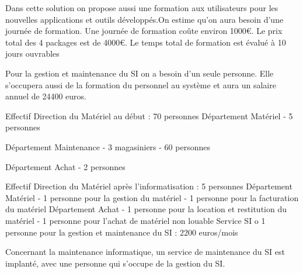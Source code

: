 Dans cette solution on propose aussi une formation aux utilisateurs pour les nouvelles applications et outils
développés.On estime qu’on aura besoin d’une journée de formation. Une journée de formation coûte environ 1000€.
Le prix total des 4 packages est de 4000€.
Le temps total de formation est évalué à 10 jours ouvrables

Pour la gestion et maintenance du SI on a besoin d'un seule personne. Elle s’occupera aussi de la formation
du personnel au système et aura un salaire annuel de 24400 euros.

Effectif Direction du Matériel au début : 70 personnes
Département Matériel
- 5 personnes

Département Maintenance
- 3 magasiniers
- 60 personnes

Département Achat
- 2 personnes

Effectif Direction du Matériel après l'informatisation : 5 personnes
Département Matériel
- 1 personne pour la gestion du matériel
- 1 personne pour la facturation du matériel
Département Achat
- 1 personne pour la location et restitution du matériel
- 1 personne pour l’achat de matériel non louable
Service SI
o 1 personne pour la gestion et maintenance du SI : 2200 euros/mois

Concernant la maintenance informatique, un service de maintenance du SI est implanté, 
avec une personne qui s’occupe de la gestion du SI.
